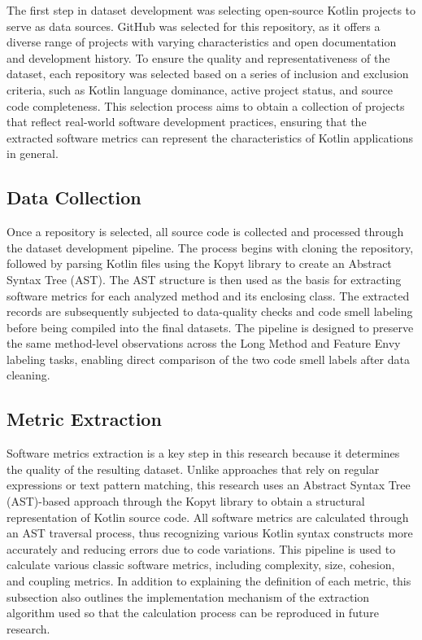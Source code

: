 \documentclass[]{einformatica}
\begin{document}
The first step in dataset development was selecting open-source Kotlin projects to serve as data sources. GitHub was selected for this repository, as it offers a diverse range of projects with varying characteristics and open documentation and development history. To ensure the quality and representativeness of the dataset, each repository was selected based on a series of inclusion and exclusion criteria, such as Kotlin language dominance, active project status, and source code completeness. This selection process aims to obtain a collection of projects that reflect real-world software development practices, ensuring that the extracted software metrics can represent the characteristics of Kotlin applications in general.

\subsection{Data Collection}

Once a repository is selected, all source code is collected and processed through the dataset development pipeline. The process begins with cloning the repository, followed by parsing Kotlin files using the Kopyt library to create an Abstract Syntax Tree (AST). The AST structure is then used as the basis for extracting software metrics for each analyzed method and its enclosing class. The extracted records are subsequently subjected to data-quality checks and code smell labeling before being compiled into the final datasets. The pipeline is designed to preserve the same method-level observations across the Long Method and Feature Envy labeling tasks, enabling direct comparison of the two code smell labels after data cleaning.

\subsection{Metric Extraction}

Software metrics extraction is a key step in this research because it determines the quality of the resulting dataset. Unlike approaches that rely on regular expressions or text pattern matching, this research uses an Abstract Syntax Tree (AST)-based approach through the Kopyt library to obtain a structural representation of Kotlin source code. All software metrics are calculated through an AST traversal process, thus recognizing various Kotlin syntax constructs more accurately and reducing errors due to code variations. This pipeline is used to calculate various classic software metrics, including complexity, size, cohesion, and coupling metrics. In addition to explaining the definition of each metric, this subsection also outlines the implementation mechanism of the extraction algorithm used so that the calculation process can be reproduced in future research.
\end{document}
